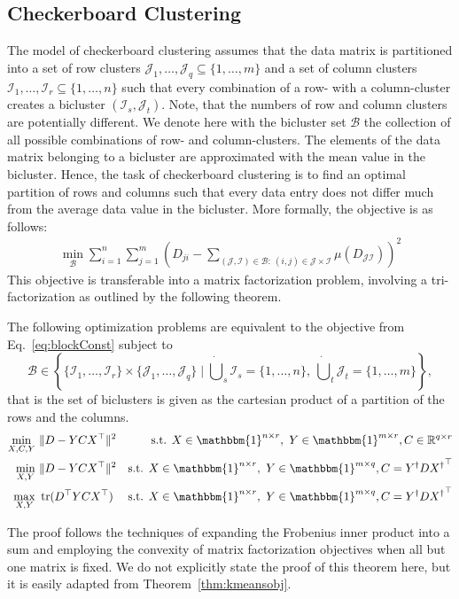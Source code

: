\subsection{Checkerboard Clustering}
The model of checkerboard clustering assumes that the data matrix is partitioned into a set of row clusters $\mathcal{J}_1,\ldots,\mathcal{J}_q\subseteq\{1,\ldots,m\}$ and a set of column clusters $\mathcal{I}_1,\ldots,\mathcal{I}_{r}\subseteq\{1,\ldots,n\}$ such that every combination of a row- with a column-cluster creates a bicluster $(\mathcal{I}_s,\mathcal{J}_t)$. Note, that the numbers of row and column clusters are potentially different. We denote here with the bicluster set $\mathcal{B}$ the collection of all possible combinations of row- and column-clusters. 
The elements of the data matrix belonging to a bicluster are approximated with the mean value in the bicluster. Hence, the task of checkerboard clustering is to find an optimal partition of rows and columns such that every data entry does not differ much from the average data value in the bicluster. More formally, the objective is as follows:
\begin{align}
   \min_{\mathcal{B}} \sum_{i=1}^n\sum_{j=1}^m \left(D_{ji}-\sum_{ (\mathcal{J},\mathcal{I})\in\mathcal{B}:\  (i,j)\in\mathcal{J}\times\mathcal{I}}\mu(D_{\mathcal{JI}})\right)^2 \label{eq:blockConst}
\end{align}
This objective is transferable into a matrix factorization problem, involving a tri-fac\-tor\-iza\-tion as outlined by the following theorem.
\begin{theorem}\label{thm:checkerboard}
The following optimization problems are equivalent to the objective from Eq.~\eqref{eq:blockConst} subject to
\[\mathcal{B}\in \left\{\{\mathcal{I}_1,\ldots,\mathcal{I}_r\}\times \{\mathcal{J}_1,\ldots,\mathcal{J}_q\}\mid \dot\bigcup_{s}\mathcal{I}_s=\{1,\ldots,n\},\  \dot\bigcup_{t}\mathcal{J}_t=\{1,\ldots,m\}\right\},\]
that is the set of biclusters is given as the cartesian product of a partition of the rows and the columns.
\begin{align}
    \label{eq:checkerOrig}
    \min_{X,C,Y}&\ \|D-YCX^\top\|^2 &
    \text{s.t. } X\in \mathbbm{1}^{n\times r},\ Y\in\mathbbm{1}^{m\times r}, C\in\mathbb{R}^{q\times r}\\ 
    \label{eq:checkerAvg}
\min_{X,Y}&\ \|D-YCX^\top\|^2&
\text{s.t. } X\in \mathbbm{1}^{n\times r},\ Y\in\mathbbm{1}^{m\times q}, C= Y^\dagger D {X^\dagger}^\top\\
\max_{X,Y}&\ \tr(D^\top YCX^\top) &
\text{s.t. } X\in \mathbbm{1}^{n\times r},\ Y\in\mathbbm{1}^{m\times q}, C= Y^\dagger D {X^\dagger}^\top
\end{align}
\end{theorem}
The proof follows the techniques of expanding the Frobenius inner product into a sum and employing the convexity of matrix factorization objectives when all but one matrix is fixed. We do not explicitly state the proof of this theorem here, but it is easily adapted from Theorem~\ref{thm:kmeansobj}.

